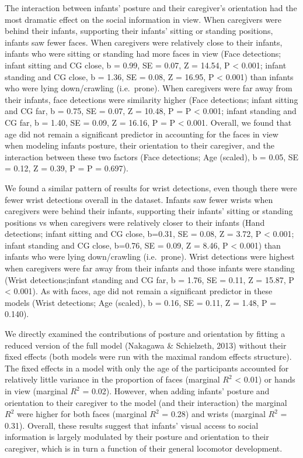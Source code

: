 \documentclass[english,man]{apa6}
\begin{document}
The interaction between infants' posture and their caregiver's
orientation had the most dramatic effect on the social information in
view. When caregivers were behind their infants, supporting their
infants' sitting or standing positions, infants saw fewer faces. When
caregivers were relatively close to their infants, infants who were
sitting or standing had more faces in view (Face detections; infant
sitting and CG close, b = 0.99, SE = 0.07, Z = 14.54, P \textless{}
0.001; infant standing and CG close, b = 1.36, SE = 0.08, Z = 16.95, P
\textless{} 0.001) than infants who were lying down/crawling
(i.e.~prone). When caregivers were far away from their infants, face
detections were similarity higher (Face detections; infant sitting and
CG far, b = 0.75, SE = 0.07, Z = 10.48, P = P \textless{} 0.001; infant
standing and CG far, b = 1.40, SE = 0.09, Z = 16.16, P = P \textless{}
0.001. Overall, we found that age did not remain a significant predictor
in accounting for the faces in view when modeling infants posture, their
orientation to their caregiver, and the interaction between these two
factors (Face detections; Age (scaled), b = 0.05, SE = 0.12, Z = 0.39, P
= P = 0.697).

We found a similar pattern of results for wrist detections, even though
there were fewer wrist detections overall in the dataset. Infants saw
fewer wrists when caregivers were behind their infants, supporting their
infants' sitting or standing positions vs when caregivers were
relatively closer to their infants (Hand detections; infant sitting and
CG close, b=0.31, SE = 0.08, Z = 3.72, P \textless{} 0.001; infant
standing and CG close, b=0.76, SE = 0.09, Z = 8.46, P \textless{} 0.001)
than infants who were lying down/crawling (i.e.~prone). Wrist detections
were highest when caregivers were far away from their infants and those
infants were standing (Wrist detections;infant standing and CG far, b =
1.76, SE = 0.11, Z = 15.87, P \textless{} 0.001). As with faces, age did
not remain a significant predictor in these models (Wrist detections;
Age (scaled), b = 0.16, SE = 0.11, Z = 1.48, P = 0.140).

We directly examined the contributions of posture and orientation by
fitting a reduced version of the full model (Nakagawa \& Schielzeth,
2013) without their fixed effects (both models were run with the maximal
random effects structure). The fixed effects in a model with only the
age of the participants accounted for relatively little variance in the
proportion of faces (marginal \(R^2\) \textless{} 0.01) or hands in view
(marginal \(R^2\) = 0.02). However, when adding infants' posture and
orientation to their caregiver to the model (and their interaction) the
marginal \(R^2\) were higher for both faces (marginal \(R^2\) = 0.28)
and wrists (marginal \(R^2\) = 0.31). Overall, these results suggest
that infants' visual access to social information is largely modulated
by their posture and orientation to their caregiver, which is in turn a
function of their general locomotor development.
\end{document}
